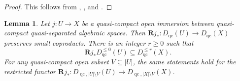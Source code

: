 \documentclass[11pt]{amsart}
\theoremstyle{plain}
\newtheorem{lemma}[theorem]{Lemma}
\theoremstyle{definition}
\numberwithin{equation}{section}
\numberwithin{theorem}{section}
\begin{document}
\begin{proof}
    This follows from \cite[Remark A.5]{GuisadoVillaalgordo/Lank:2026}, \cite[\href{https://stacks.math.columbia.edu/tag/09M8}{Tag 09M8}]{StacksProject}, and .
\end{proof}

\begin{lemma}
	\label{lem:qcqs_open_pushforward}
	Let $j\colon U\to X$ be a quasi-compact open immersion between quasi-compact quasi-separated algebraic spaces. Then
	$\mathbf{R}j_\ast\colon D_{\operatorname{qc}}(U)\to
	D_{\operatorname{qc}}(X)$ preserves small coproducts.
	There is an integer $r\geq 0$ such that
	\begin{displaymath}
		\mathbf{R}j_\ast D^{\leq 0}_{\operatorname{qc}}(U)
		\subseteq D^{\leq r}_{\operatorname{qc}}(X).
	\end{displaymath}
	For any quasi-compact open subset $V\subseteq |U|$, the same
	statements hold for the restricted functor
	$\mathbf{R}j_\ast\colon D_{\operatorname{qc},|U|\setminus V}(U)\to
	D_{\operatorname{qc},|X|\setminus V}(X)$.
\end{lemma}
\end{document}
